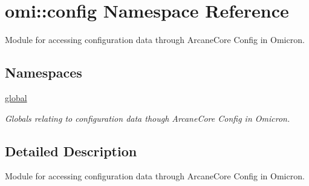 \hypertarget{namespaceomi_1_1config}{}\section{omi\+:\+:config Namespace Reference}
\label{namespaceomi_1_1config}


Module for accessing configuration data through Arcane\+Core Config in Omicron.  


\subsection*{Namespaces}
\begin{DoxyCompactItemize}
\item 
 \hyperlink{namespaceomi_1_1config_1_1global}{global}
\begin{DoxyCompactList}\small\item\em Globals relating to configuration data though Arcane\+Core Config in Omicron. \end{DoxyCompactList}\end{DoxyCompactItemize}


\subsection{Detailed Description}
Module for accessing configuration data through Arcane\+Core Config in Omicron. 